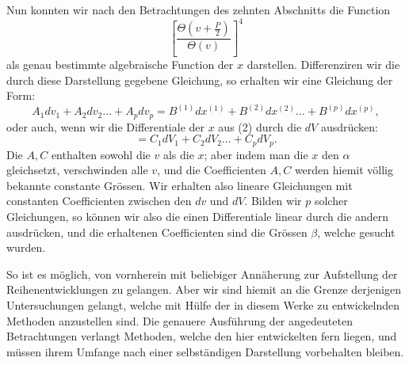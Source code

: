 \documentclass[10pt]{article}
\begin{document}
Nun konnten wir nach den Betrachtungen des zehnten Abschnitts die Function
\[
\left[\frac{\Theta\left(v+\frac P2\right)}{\Theta(v)}\right]^4
\]
als genau bestimmte algebraische Function der \(x\) darstellen. Differenziren wir die durch diese Darstellung gegebene Gleichung, so erhalten wir eine Gleichung der Form:
\[
A_1dv_1+A_2dv_2\ldots+A_pdv_p=B^{(1)}dx^{(1)}+B^{(2)}dx^{(2)}\ldots+B^{(p)}dx^{(p)},
\]
oder auch, wenn wir die Differentiale der \(x\) aus (2) durch die \(dV\) ausdrücken:
\[
=C_1dV_1+C_2dV_2\ldots+C_pdV_p.
\]
Die \(A,C\) enthalten sowohl die \(v\) als die \(x\); aber indem man die \(x\) den \(\alpha\) gleichsetzt, verschwinden alle \(v\), und die Coefficienten \(A,C\) werden hiemit völlig bekannte constante Grössen. Wir erhalten also lineare Gleichungen mit constanten Coefficienten zwischen den \(dv\) und \(dV\). Bilden wir \(p\) solcher Gleichungen, so können wir also die einen Differentiale linear durch die andern ausdrücken, und die erhaltenen Coefficienten sind die Grössen \(\beta\), welche gesucht wurden.

So ist es möglich, von vornherein mit beliebiger Annäherung zur Aufstellung der Reihenentwicklungen zu gelangen. Aber wir sind hiemit an die Grenze derjenigen Untersuchungen gelangt, welche mit Hülfe der in diesem Werke zu entwickelnden Methoden anzustellen sind. Die genauere Ausführung der angedeuteten Betrachtungen verlangt Methoden, welche den hier entwickelten fern liegen, und müssen ihrem Umfange nach einer selbständigen Darstellung vorbehalten bleiben.
\end{document}
